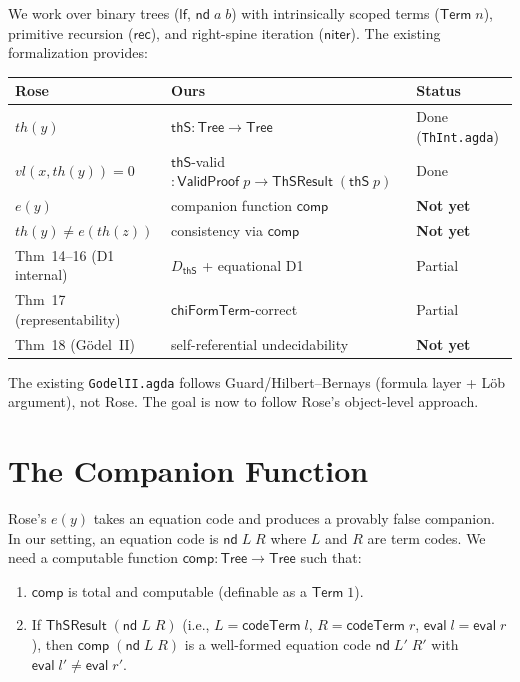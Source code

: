 \documentclass[11pt]{article}
\newcommand{\lf}{\mathsf{lf}}
\newcommand{\nd}{\mathsf{nd}}
\newcommand{\rec}{\mathsf{rec}}
\newcommand{\niter}{\mathsf{niter}}
\newcommand{\eval}{\mathsf{eval}}
\newcommand{\codeTerm}{\mathsf{codeTerm}}
\newcommand{\thS}{\mathsf{thS}}
\newcommand{\Tree}{\mathsf{Tree}}
\newcommand{\Term}{\mathsf{Term}}
\newcommand{\dThS}{D_{\thS}}
\newcommand{\ValidProof}{\mathsf{ValidProof}}
\newcommand{\ThSResult}{\mathsf{ThSResult}}
\newcommand{\comp}{\mathsf{comp}}
\begin{document}
We work over binary trees ($\lf$, $\nd\;a\;b$) with intrinsically
scoped terms ($\Term\;n$), primitive recursion ($\rec$), and
right-spine iteration ($\niter$).  The existing formalization provides:

\begin{center}
\begin{tabular}{lll}
\textbf{Rose} & \textbf{Ours} & \textbf{Status} \\
\hline
$th(y)$ & $\thS : \Tree \to \Tree$ & Done (\texttt{ThInt.agda}) \\
$vl(x, th(y)) = 0$ & $\thS$-valid $: \ValidProof\;p \to \ThSResult\;(\thS\;p)$
  & Done \\
$e(y)$ & companion function $\comp$ & \textbf{Not yet} \\
$th(y) \neq e(th(z))$ & consistency via $\comp$ & \textbf{Not yet} \\
Thm~14--16 (D1 internal) & $\dThS$ + equational D1 & Partial \\
Thm~17 (representability) & $\mathsf{chiFormTerm}$-correct & Partial \\
Thm~18 (G\"odel~II) & self-referential undecidability & \textbf{Not yet} \\
\end{tabular}
\end{center}

\noindent
The existing \texttt{GodelII.agda} follows Guard/Hilbert--Bernays
(formula layer + L\"ob argument), not Rose.  The goal is now to
follow Rose's object-level approach.


\section{The Companion Function}\label{sec:companion}

Rose's $e(y)$ takes an equation code and produces a provably false
companion.  In our setting, an equation code is $\nd\;L\;R$
where $L$ and $R$ are term codes.  We need a computable function
$\comp : \Tree \to \Tree$ such that:

\begin{enumerate}
\item[(C1)] $\comp$ is total and computable (definable as a $\Term\;1$).
\item[(C2)] If $\ThSResult\;(\nd\;L\;R)$ (i.e., $L = \codeTerm\;l$,
  $R = \codeTerm\;r$, $\eval\;l = \eval\;r$), then $\comp\;(\nd\;L\;R)$
  is a well-formed equation code $\nd\;L'\;R'$ with $\eval\;l' \neq \eval\;r'$.
\end{enumerate}
\end{document}
